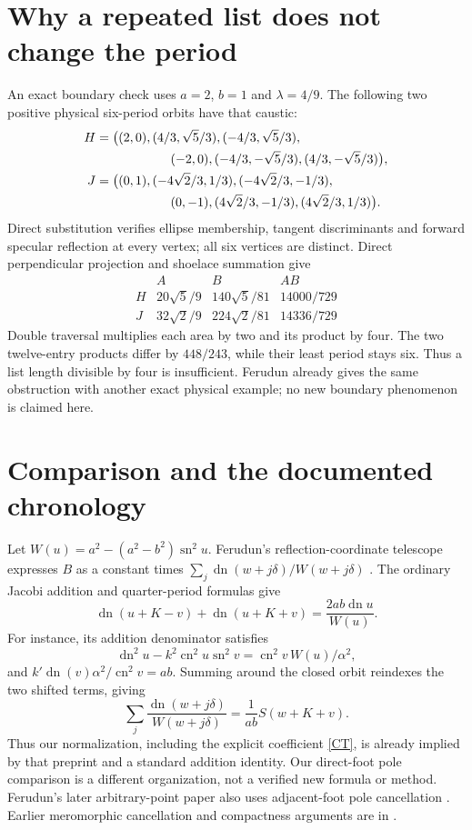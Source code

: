 \documentclass[11pt]{article}
\newcommand{\sn}{\operatorname{sn}}
\newcommand{\cn}{\operatorname{cn}}
\newcommand{\dn}{\operatorname{dn}}
\begin{document}
\section{Why a repeated list does not change the period}\label{repetition}
An exact boundary check uses $a=2$, $b=1$ and $\lambda=4/9$.
The following two positive physical six-period orbits have that caustic:
\begin{align*}
 H={}&\bigl((2,0),(4/3,\sqrt5/3),(-4/3,\sqrt5/3),\\
     &\hspace{16mm}(-2,0),(-4/3,-\sqrt5/3),(4/3,-\sqrt5/3)\bigr),\\
 J={}&\bigl((0,1),(-4\sqrt2/3,1/3),(-4\sqrt2/3,-1/3),\\
     &\hspace{16mm}(0,-1),(4\sqrt2/3,-1/3),(4\sqrt2/3,1/3)\bigr).
\end{align*}
Direct substitution verifies ellipse membership, tangent discriminants
and forward specular reflection at every vertex; all six vertices are
distinct. Direct perpendicular projection and shoelace summation give
\[
\begin{array}{c|ccc}
 & A&B&AB\\\hline
 H&20\sqrt5/9&140\sqrt5/81&14000/729\\
 J&32\sqrt2/9&224\sqrt2/81&14336/729
\end{array}
\]
Double traversal multiplies each area by two and its product by four.
The two twelve-entry products differ by $448/243$, while their least
period stays six. Thus a list length divisible by four is insufficient.
Ferudun \cite[Section~6]{Ferudun} already gives the same obstruction
with another exact physical example; no new boundary phenomenon is
claimed here.

\section{Comparison and the documented chronology}\label{comparison}
Let $W(u)=a^2-(a^2-b^2)\sn^2u$. Ferudun's reflection-coordinate
telescope expresses $B$ as a constant times
$\sum_j\dn(w+j\delta)/W(w+j\delta)$ \cite[Lemma~3]{Ferudun}.
The ordinary Jacobi addition and quarter-period formulas give
\[
 \dn(u+K-v)+\dn(u+K+v)=\frac{2ab\dn u}{W(u)}.
\]
For instance, its addition denominator satisfies
\[
 \dn^2u-k^2\cn^2u\sn^2v=\cn^2v\,W(u)/\alpha^2,
\]
and
$k'\dn(v)\alpha^2/\cn^2v=ab$. Summing around the closed
orbit reindexes the two shifted terms, giving
\[
 \sum_j\frac{\dn(w+j\delta)}{W(w+j\delta)}
  =\frac1{ab}S(w+K+v).
\]
Thus our normalization, including the explicit coefficient \eqref{CT},
is already implied by that preprint and a standard addition identity.
Our direct-foot pole comparison is a different organization, not a
verified new formula or method. Ferudun's later arbitrary-point paper
also uses adjacent-foot pole cancellation \cite[Lemma~4.3]{FerudunGeneral}.
Earlier meromorphic cancellation and compactness arguments are in
\cite{AST,Chavez}.
\end{document}
